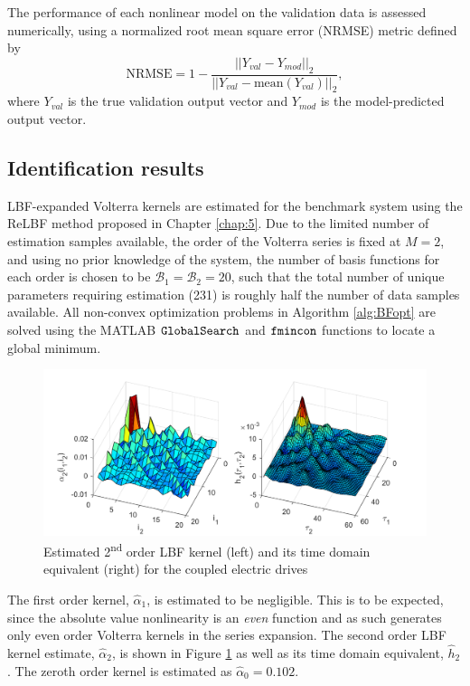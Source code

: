 The performance of each nonlinear model on the validation data is assessed numerically, using a normalized root mean square error (NRMSE) metric defined by 
\begin{equation}
\text{NRMSE} = 1 - \frac{||Y_{val}-Y_{mod}||_2}{||Y_{val} - \text{mean}(Y_{val}) ||_2},
\label{eqn:NRMSE_CED}
\end{equation}
where $Y_{val}$ is the true validation output vector and $Y_{mod}$ is the model-predicted output vector.

\subsection{Identification results}
\label{sec:Results_CED}

LBF-expanded Volterra kernels are estimated for the benchmark system using the ReLBF method proposed in Chapter \ref{chap:5}. Due to the limited number of estimation samples available, the order of the Volterra series is fixed at $M=2$, and using no prior knowledge of the system, the number of basis functions for each order is chosen to be $\mathcal{B}_1=\mathcal{B}_2=20$, such that the total number of unique parameters requiring estimation (231) is roughly half the number of data samples available. All non-convex optimization problems in Algorithm \ref{alg:BFopt} are solved using the MATLAB $\text{\tt{GlobalSearch}}$ and $\text{\tt{fmincon}}$ functions to locate a global minimum.

\begin{figure}[!b]
\centering
\includegraphics[width=\textwidth]{Chapter6_CaseStudies/Kernels2ndOrder_CED_Coloured}
\caption{Estimated 2\textsuperscript{nd} order LBF kernel (left) and its time domain equivalent (right) for the coupled electric drives} \label{fig:Kernel2_CED}
\end{figure}

The first order kernel, $\hat{\alpha}_1$, is estimated to be negligible. This is to be expected, since the absolute value nonlinearity is an \emph{even} function and as such generates only even order Volterra kernels in the series expansion. The second order LBF kernel estimate, $\hat{\alpha}_2$, is shown in Figure \ref{fig:Kernel2_CED} as well as its time domain equivalent, $\hat{h}_2$. The zeroth order kernel is estimated as $\hat{\alpha}_0 = 0.102$.

